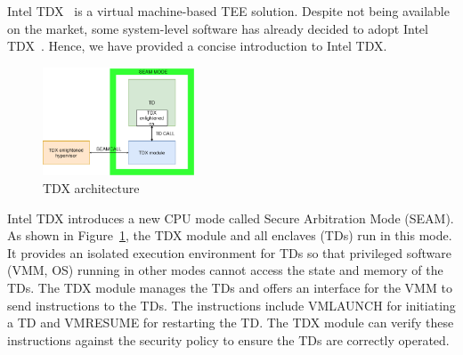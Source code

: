 Intel TDX~\cite*{Intel_tdx_whitepaper} is a virtual machine-based TEE solution. Despite not being available on the market, some system-level software has already decided to adopt Intel TDX~\cite*{Kate_support_tdx, Linux_support_tdx}. Hence, we have provided a concise introduction to Intel TDX.
\begin{figure}[htp]
  \centering
  \includegraphics[width=0.4\textwidth]{images/td_arch.png}
  \caption[TDX architecture]{TDX architecture}
  \label{fig:td_arch}
\end{figure}
Intel TDX introduces a new CPU mode called Secure Arbitration Mode (SEAM). As shown in Figure~\ref{fig:td_arch}, the TDX module and all enclaves (TDs) run in this mode. It provides an isolated execution environment for TDs so that privileged software (VMM, OS) running in other modes cannot access 
the state and memory of the TDs. The TDX module manages the TDs and offers an interface for the VMM to send instructions to the TDs. The instructions include VMLAUNCH for initiating a TD and VMRESUME for restarting the TD. The TDX module can verify these instructions against the security 
policy to ensure the TDs are correctly operated.
